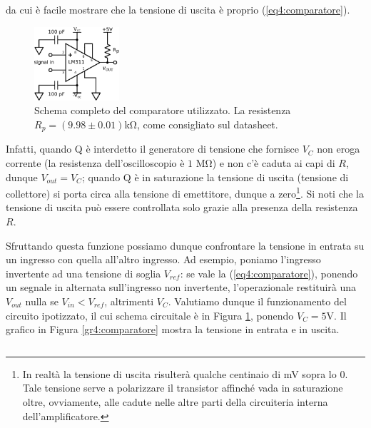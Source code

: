 da cui è facile mostrare che la tensione di uscita è proprio (\ref{eq4:comparatore}).

\begin{figure}
  \begin{center}
    \includegraphics[width=0.280\textwidth]{../E04/latex/c_comparatore.pdf}
  \end{center}
  \caption{Schema completo del comparatore utilizzato. La resistenza $R_p=(9.98 \pm 0.01)$\si{\kilo\ohm}, come consigliato sul datasheet.}
  \label{cir4:comparatore}
\end{figure}
Infatti, quando Q è interdetto il generatore di tensione che fornisce $V_C$ non eroga corrente (la resistenza dell'oscilloscopio è $1$ \si{\mega\ohm}) e non c'è caduta ai capi di $R$, dunque $V_{out}=V_C$; quando Q è in saturazione la tensione di uscita (tensione di collettore) si porta circa alla tensione di emettitore, dunque a zero\footnote{In realtà la tensione di uscita risulterà qualche centinaio di \si{\milli\volt} sopra lo $0$. Tale tensione serve a polarizzare il transistor affinché vada in saturazione oltre, ovviamente, alle cadute nelle altre parti della circuiteria interna dell'amplificatore.}. Si noti che la tensione di uscita può essere controllata solo grazie alla presenza della resistenza $R$.

Sfruttando questa funzione possiamo dunque confrontare la tensione in entrata su un ingresso con quella all'altro ingresso. Ad esempio, poniamo l'ingresso invertente ad una tensione di soglia $V_{ref}$: se vale la (\ref{eq4:comparatore}), ponendo un segnale in alternata sull'ingresso non invertente, l'operazionale restituirà una $V_{out}$ nulla se $V_{in}<V_{ref}$, altrimenti $V_C$. Valutiamo dunque il funzionamento del circuito ipotizzato, il cui schema circuitale è in Figura \ref{cir4:comparatore}, ponendo $V_{C}=5$\si{\volt}. Il grafico in Figura \ref{gr4:comparatore} mostra la tensione in entrata e in uscita.

$$$$

